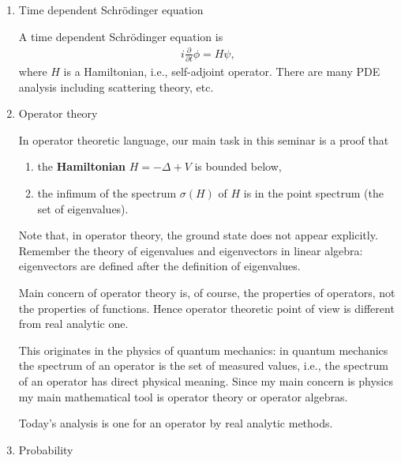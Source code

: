 \documentclass[openany, a4paper, oneside]{jsbook}
\begin{document}
\begin{enumerate}
\item Time dependent Schr\"odinger equation

A time dependent Schr\"odinger equation is
\begin{align}
 i \frac{\partial}{\partial t} \phi = H \psi,
\end{align}
where $H$ is a Hamiltonian, i.e., self-adjoint operator.
There are many PDE analysis including scattering theory, etc.
\item Operator theory

In operator theoretic language, our main task in this seminar is a proof that
\begin{enumerate}
\item the \textbf{Hamiltonian} $H = - \Delta + V$ is bounded below,
\item the infimum of the spectrum $\sigma (H)$ of $H$ is in the point spectrum (the set of eigenvalues).
\end{enumerate}
Note that, in operator theory, the ground state does not appear explicitly.
Remember the theory of eigenvalues and eigenvectors in linear algebra:
eigenvectors are defined after the definition of eigenvalues.

Main concern of operator theory is, of course, the properties of operators, not the properties of functions.
Hence operator theoretic point of view is different from real analytic one.

This originates in the physics of quantum mechanics:
in quantum mechanics the spectrum of an operator is the set of measured values, i.e.,
the spectrum of an operator has direct physical meaning.
Since my main concern is physics my main mathematical tool is operator theory or operator algebras.

Today's analysis is one for an operator by real analytic methods.
\item Probability


\end{enumerate}
\end{document}
